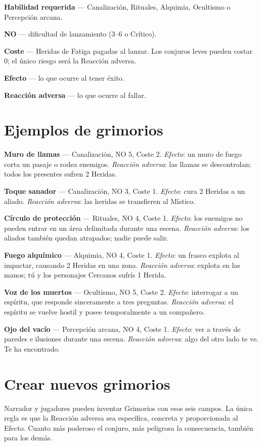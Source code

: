 \documentclass[10pt,a4paper]{article}
\begin{document}
\textbf{Habilidad requerida} — Canalización, Rituales, Alquimia, Ocultismo o Percepción arcana.

\textbf{NO} — dificultad de lanzamiento (3–6 o Crítico).

\textbf{Coste} — Heridas de Fatiga pagadas al lanzar. Los conjuros leves pueden costar 0; el único riesgo será la Reacción adversa.

\textbf{Efecto} — lo que ocurre al tener éxito.

\textbf{Reacción adversa} — lo que ocurre al fallar.

\section*{Ejemplos de grimorios}
\textbf{Muro de llamas} — Canalización, NO 5, Coste 2. \textit{Efecto}: un muro de fuego corta un pasaje o rodea enemigos. \textit{Reacción adversa}: las llamas se descontrolan; todos los presentes sufren 2 Heridas.

\textbf{Toque sanador} — Canalización, NO 3, Coste 1. \textit{Efecto}: cura 2 Heridas a un aliado. \textit{Reacción adversa}: las heridas se transfieren al Místico.

\textbf{Círculo de protección} — Rituales, NO 4, Coste 1. \textit{Efecto}: los enemigos no pueden entrar en un área delimitada durante una escena. \textit{Reacción adversa}: los aliados también quedan atrapados; nadie puede salir.

\textbf{Fuego alquímico} — Alquimia, NO 4, Coste 1. \textit{Efecto}: un frasco explota al impactar, causando 2 Heridas en una zona. \textit{Reacción adversa}: explota en las manos; tú y los personajes Cercanos sufrís 1 Herida.

\textbf{Voz de los muertos} — Ocultismo, NO 5, Coste 2. \textit{Efecto}: interrogar a un espíritu, que responde sinceramente a tres preguntas. \textit{Reacción adversa}: el espíritu se vuelve hostil y posee temporalmente a un compañero.

\textbf{Ojo del vacío} — Percepción arcana, NO 4, Coste 1. \textit{Efecto}: ver a través de paredes e ilusiones durante una escena. \textit{Reacción adversa}: algo del otro lado te ve. Te ha encontrado.

\section*{Crear nuevos grimorios}
Narrador y jugadores pueden inventar Grimorios con esos seis campos. La única regla es que la Reacción adversa sea específica, concreta y proporcionada al Efecto. Cuanto más poderoso el conjuro, más peligrosa la consecuencia, también para los demás.
\end{document}
